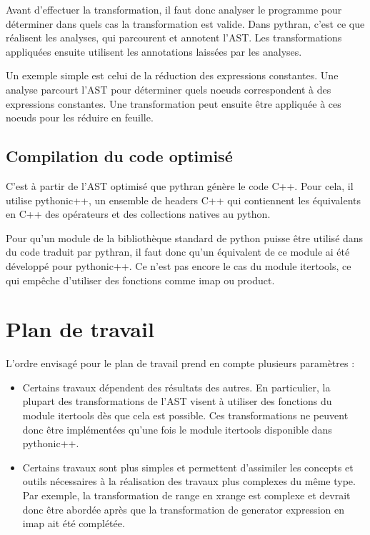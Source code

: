 \documentclass[a4paper]{article}
\begin{document}
Avant d'effectuer la transformation, il faut donc analyser le
programme pour déterminer dans quels cas la transformation est
valide. Dans pythran, c'est ce que réalisent les analyses, qui
parcourent et annotent l'AST. Les transformations appliquées ensuite
utilisent les annotations laissées par les analyses.

Un exemple simple est celui de la réduction des expressions
constantes. Une analyse parcourt l'AST pour déterminer quels noeuds
correspondent à des expressions constantes. Une transformation peut
ensuite être appliquée à ces noeuds pour les réduire en feuille.

\subsection{Compilation du code optimisé}

\label{pythonicpp}

C'est à partir de l'AST optimisé que pythran génère le code C++. Pour
cela, il utilise pythonic++, un ensemble de headers C++ qui
contiennent les équivalents en C++ des opérateurs et des collections
natives au python.

Pour qu'un module de la bibliothèque standard de python puisse être
utilisé dans du code traduit par pythran, il faut donc qu'un
équivalent de ce module ai été développé pour pythonic++. Ce n'est pas
encore le cas du module itertools, ce qui empêche d'utiliser des
fonctions comme imap ou product.

\section{Plan de travail}

L'ordre envisagé pour le plan de travail prend en compte plusieurs
paramètres :

\begin{itemize}
\item Certains travaux dépendent des résultats des autres. En
  particulier, la plupart des transformations de l'AST visent à
  utiliser des fonctions du module itertools dès que cela est
  possible. Ces transformations ne peuvent donc être implémentées
  qu'une fois le module itertools disponible dans pythonic++.
\item Certains travaux sont plus simples et permettent d'assimiler les
  concepts et outils nécessaires à la réalisation des travaux plus
  complexes du même type. Par exemple, la transformation de range en
  xrange est complexe et devrait donc être abordée après que la
  transformation de generator expression en imap ait été complétée.
\end{itemize}
\end{document}
